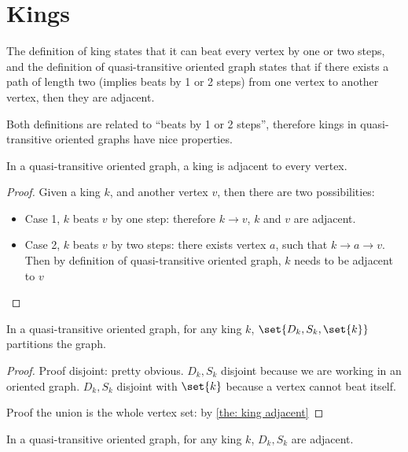\section{Kings}

The definition of king states that it can beat every vertex
by one or two steps,
and the definition of quasi-transitive oriented graph states that
if there exists a path of length two (implies beats by 1 or 2 steps)
from one vertex to another vertex, then they are adjacent.

Both definitions are related to ``beats by 1 or 2 steps'',
therefore kings in quasi-transitive oriented graphs
have nice properties.

\begin{lemma}\label{the: king adjacent}
  In a quasi-transitive oriented graph,
  a king is adjacent to every vertex.
\end{lemma}

\begin{proof}
  Given a king \(k\), and another vertex \(v\),
  then there are two possibilities:
  \begin{itemize}
    \item
      Case 1, \(k\) beats \(v\) by one step:
      therefore \(k \to v\), \(k\) and \(v\) are adjacent.
    \item
      Case 2, \(k\) beats \(v\) by two steps:
      there exists vertex \(a\), such that \(k \to a \to v\).
      Then by definition of quasi-transitive oriented graph,
      \(k\) needs to be adjacent to \(v\)
  \end{itemize}
\end{proof}

\begin{lemma}
  In a quasi-transitive oriented graph,
  for any king \(k\), \(\set{D_k, S_k, \set{k}}\)
  partitions the graph.
\end{lemma}

\begin{proof}
  Proof disjoint: pretty obvious.
  \(D_k, S_k\) disjoint because we are working in an oriented graph.
  \(D_k, S_k\) disjoint with \(\set{k}\)
  because a vertex cannot beat itself.

  Proof the union is the whole vertex set:
  by \cref{the: king adjacent}
\end{proof}

\begin{lemma}
  In a quasi-transitive oriented graph,
  for any king \(k\), \(D_k, S_k\) are adjacent.
\end{lemma}

